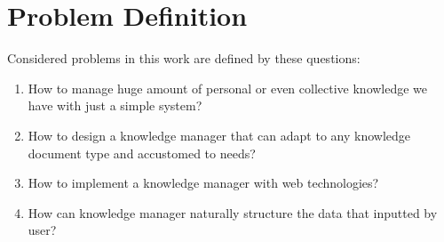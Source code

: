 \section{Problem Definition}
\label{sec:problem-definition}

Considered problems in this work are defined by these questions:

\begin{enumerate}
\item How to manage huge amount of personal or even collective knowledge we have with just a simple system?
\item How to design a knowledge manager that can adapt to any knowledge document type and accustomed to needs?
\item How to implement a knowledge manager with web technologies?
\item How can knowledge manager naturally structure the data that inputted by user?
\end{enumerate}

